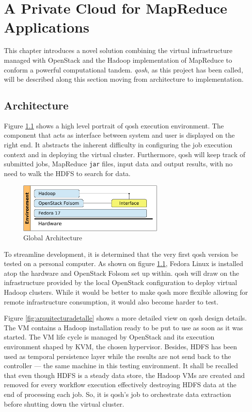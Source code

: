 \chapter{A Private Cloud for MapReduce Applications}\label{cap:solucion}
\noindent This chapter introduces a novel solution combining the virtual infrastructure managed with OpenStack and the Hadoop implementation of MapReduce to conform a powerful computational tandem. \emph{qosh}, as this project has been called, will be described along this section moving from architecture to implementation.

\section{Architecture}\label{sec:diseno}
\noindent Figure \ref{fig:arquitecturaglobal} shows a high level portrait of qosh execution environment. The component that acts as interface between system and user is displayed on the right end. It abstracts the inherent difficulty in configuring the job execution context and in deploying the virtual cluster. Furthermore, qosh will keep track of submitted jobs, MapReduce \texttt{jar} files, input data and output results, with no need to walk the HDFS to search for data.

\begin{figure}[tbp]
\begin{center}
\includegraphics[width=0.65\textwidth]{imagenes/021.pdf}
 \caption{Global Architecture}
\label{fig:arquitecturaglobal}
\end{center}
\end{figure}

To streamline development, it is determined that the very first qosh version be tested on a personal computer. As shown on figure \ref{fig:arquitecturaglobal}, Fedora Linux is installed atop the hardware and OpenStack Folsom set up within. qosh will draw on the infrastructure provided by the local OpenStack configuration to deploy virtual Hadoop clusters. While it would be better to make qosh more flexible allowing for remote infrastructure consumption, it would also become harder to test.

Figure \ref{fig:arquitecturadetalle} shows a more detailed view on qosh design details. The VM contains a Hadoop installation ready to be put to use as soon as it was started. The VM life cycle is managed by OpenStack and its execution environment shaped by KVM, the chosen hypervisor. Besides, HDFS has been used as temporal persistence layer while the results are not send back to the controller --- the same machine in this testing environment. It shall be recalled that even though HDFS is a steady data store, the Hadoop VMs are created and removed for every workflow execution effectively destroying HDFS data at the end of processing each job. So, it is qosh's job to orchestrate data extraction before shutting down the virtual cluster.

